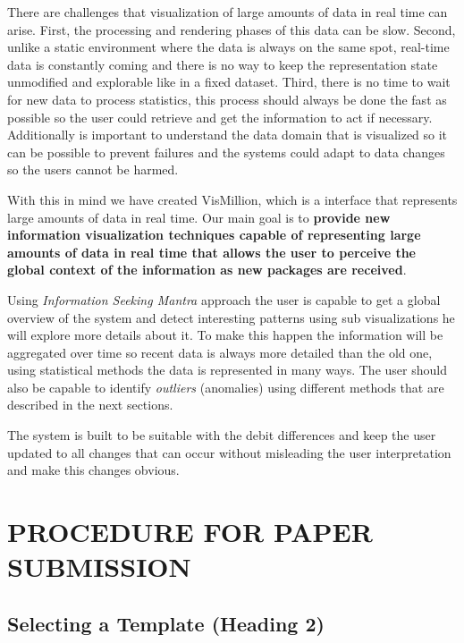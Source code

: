 \documentclass[letterpaper, 10 pt, conference]{ieeeconf}  %
\begin{document}
There are challenges that visualization of large amounts of data in real time can arise. First, the processing and rendering phases of this data can be slow. Second, unlike a static environment where the data is always on the same spot, real-time data is constantly coming and there is no way to keep the representation state unmodified and explorable like in a fixed dataset. Third, there is no time to wait for new data to process statistics, this process should always be done the fast as possible so the user could retrieve and get the information to act if necessary. Additionally is important to understand the data domain that is visualized so it can be possible to prevent failures and the systems could adapt to data changes so the users cannot be harmed. 

With this in mind we have created VisMillion, which is a interface that represents large amounts of data in real time. Our main goal is to \textbf{provide new information visualization techniques capable of representing large amounts of data in real time that allows the user to perceive the global context of the information as new packages are received}.

Using \textit{Information Seeking Mantra} approach \cite{545307} the user is capable to get a global overview of the system and detect interesting patterns using sub visualizations he will explore more details about it. To make this happen the information will be aggregated over time so recent data is always more detailed than the old one, using statistical methods the data is represented in many ways. The user should also be capable to identify \textit{outliers} (anomalies) using different methods that are described in the next sections.

The system is built to be suitable with the debit differences and keep the user updated to all changes that can occur without misleading the user interpretation and make this changes obvious.






\section{PROCEDURE FOR PAPER SUBMISSION}

\subsection{Selecting a Template (Heading 2)}
\end{document}
